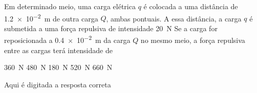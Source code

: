 \question [20] Em determinado meio, uma carga elétrica $q$ é colocada a uma distância de \SI{1.2e-2}{\meter}   de outra carga $Q$, ambas pontuais. A essa distância, a carga $q$ é submetida a uma força repulsiva de intensidade \SI{20}{\newton}  Se a carga   for reposicionada a \SI{.4e-2}{\meter} da carga $Q$ no mesmo meio, a força repulsiva entre as cargas terá intensidade de

		\begin{EnvUplevel}
			\begin{choices}
			\choice \SI{360}{\newton}
			\choice \SI{480}{\newton}
			\correctchoice \SI{180}{\newton}
			\choice \SI{520}{\newton}
			\choice \SI{660}{\newton}
			\end{choices}
		\end{EnvUplevel}
		
		\begin{EnvUplevel}
		\begin{solution}
		Aqui é digitada a resposta correta
		\end{solution}
		\end{EnvUplevel}

	
